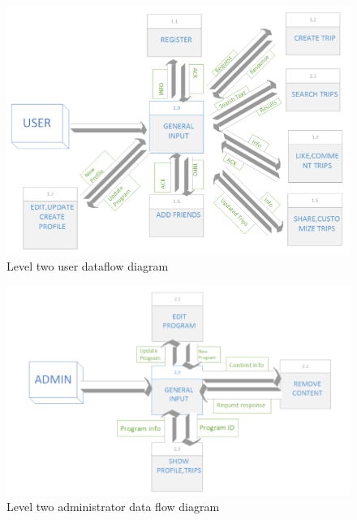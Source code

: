 \begin{figure}[!ht]
\centering
\includegraphics[scale=0.6]{projectChapters/images/dataflow3.png}
\caption{Level two user dataflow diagram}
\label{fig:dataflow3}
\end{figure}

\begin{figure}[!ht]
\centering
\includegraphics[scale=0.6]{projectChapters/images/dataflow4.png}
\caption{Level two administrator data flow diagram}
\label{fig:dataflow4}
\end{figure}






